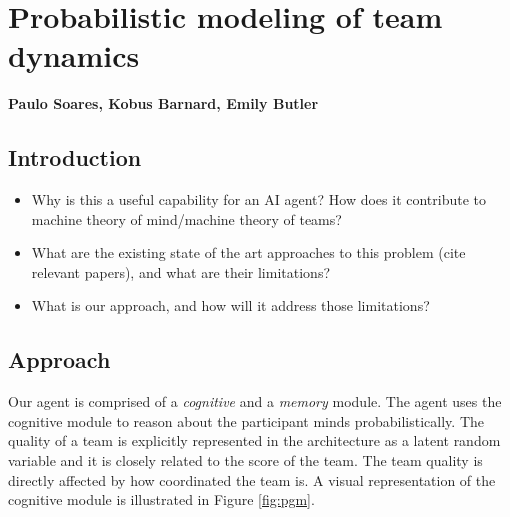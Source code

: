 \chapter{Probabilistic modeling of team dynamics}
\textbf{Paulo Soares, Kobus Barnard, Emily Butler}
\section{Introduction}
\begin{itemize}
    \item Why is this a useful capability for an AI
        agent? How does it contribute to machine theory of mind/machine theory
        of teams?
    \item What are the existing state of the art approaches to this problem
        (cite relevant papers), and what are their limitations? 
    \item What is our approach, and how will it address those limitations?
\end{itemize}

\section{Approach}

Our agent is comprised of a \emph{cognitive} and a \emph{memory} module. The agent uses the cognitive module to reason about the participant minds probabilistically. The quality of a team is explicitly represented in the architecture as a latent random variable and it is closely related to the score of the team. The team quality is directly affected by how coordinated the team is. A visual representation of the cognitive module is illustrated in Figure \ref{fig:pgm}. 

